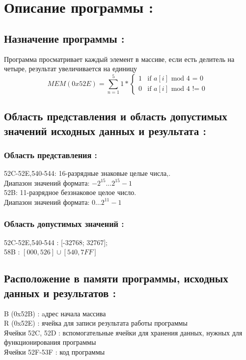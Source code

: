 \newpage
\thispagestyle{empty}
\section{\textbf{\Large{Описание программы :}}}
\subsection{Назначение программы :}
Программа просматривает каждый элемент в массиве, если есть делитель на четыре, результат увеличивается на единицу
\[MEM(0x52E) =  \sum_{n=1}^{5} 1 *
\begin{cases}
    1       & \text{if } a[i] \text{ mod 4 = 0} \\
    0       & \text{if } a[i]  \text{ mod 4 != 0}
\end{cases}
\]
\subsection{Область представления и область допустимых значений исходных данных и результата :}
\subsubsection{Область представления :}
52C-52E,540-544: 16-разрядные знаковые целые числа,.\\
Диапазон значений формата: $-2^{15}\ldots2^{15}-1$ \\
52B: 11-разрядное беззнаковое целое число. \\
Диапазон значений формата: $0\ldots2^{11} - 1$
\subsubsection{Область допустимых значений :}
52C-52E,540-544 : [-32768; 32767]; \\
58B : $[000, 526]\cup[540,7FF]$ \\
\subsection{Расположение в памяти программы, исходных данных и результатов :}
B (0x52B) : aдрес начала массива \\
R (0x52E) : ячейка для записи результата работы программы \\
Ячейки 52C, 52D : вспомогательные ячейки для хранения данных, нужных для функционирования программы\\
Ячейки 52F-53F : код программы \\
